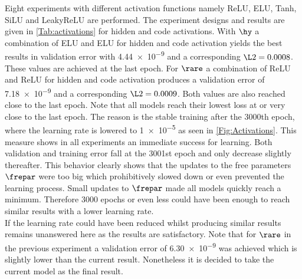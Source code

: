 Eight experiments with different activation functions namely ReLU, ELU, Tanh, SiLU and LeakyReLU are performed. The experiment designs and results are given in \cref{Tab:activations} for hidden and code activations. With \(\hy\) a combination of ELU and ELU for hidden and code activation yields the best results in validation error with \num{4.44e-9} and a corresponding \(\L2 = 0.0008\). These values are achieved at the last epoch. For \(\rare\) a combination of ReLU and ReLU for hidden and code activation produces a validation error of \num{7.18e-9} and a corresponding \(\L2 = 0.0009\). Both values are also reached close to the last epoch. Note that all models reach their lowest loss at or very close to the last epoch. The reason is the stable training after the 3000th epoch, where the learning rate is lowered to \num{1e-5} as seen in \cref{Fig:Activations}. This measure shows in all experiments an immediate success for learning. Both validation and training error fall at the 3001st epoch and only decrease slightly thereafter. This behavior clearly shows that the updates to the free parameters \(\frepar\) were too big which prohibitively slowed down or even prevented the learning process. Small updates to \(\frepar\) made all models quickly reach a minimum. Therefore 3000 epochs or even less could have been enough to reach similar results with a lower learning rate.\\
If the learning rate could have been reduced whilst producing similar results remains unanswered here as the results are satisfactory. Note that for \(\rare\) in the previous experiment a validation error of \num{6.30e-9} was achieved which is slightly lower than the current result. Nonetheless it is decided to take the current model as the final result.\\
